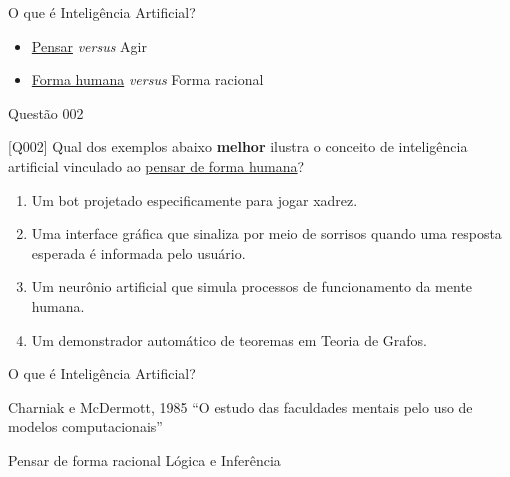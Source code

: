 \documentclass[xcolor=dvipsnames,table]{beamer}
\begin{document}
        \begin{frame}{O que é Inteligência Artificial?}
		\begin{itemize}
			\item \underline{Pensar} {\it versus} Agir
			 \item \underline{Forma humana} {\it versus} Forma racional %
		\end{itemize}
	\end{frame} 

         \begin{frame}{Questão 002}
		\begin{block}{[Q002]}
			Qual dos exemplos abaixo {\bf melhor} ilustra o conceito de inteligência artificial vinculado ao \underline{pensar de forma humana}?
		\end{block}
		\begin{enumerate}[label=(\Alph*)]
			\item Um bot projetado especificamente para jogar xadrez.
			\item Uma interface gráfica que sinaliza por meio de sorrisos quando uma resposta esperada é informada pelo usuário.
			\item Um neurônio artificial que simula processos de funcionamento da mente humana.
			\item Um demonstrador automático de teoremas em Teoria de Grafos.
		\end{enumerate}
	\end{frame}
	
	\begin{frame}{O que é Inteligência Artificial?}
		\begin{block}{Charniak e McDermott, 1985}
			``O estudo das faculdades mentais pelo uso de modelos computacionais''
		\end{block}\pause
		\begin{exampleblock}{Pensar de forma racional}
			Lógica e Inferência
		\end{exampleblock}
	\end{frame}
\end{document}
